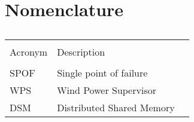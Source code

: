 \chapter{Nomenclature}


\begin{table}[ht]
\caption[Nomenclature]{\textsc{}} %
\centering %
\begin{tabular}{l l l} %
\hline\hline\\ %
 Acronym & Description \\ [0.5ex] %
\hline\\ %

	SPOF & Single point of failure \\
	WPS &  Wind Power Supervisor\\
	DSM &  Distributed Shared Memory\\[1ex] %

\hline %
\end{tabular}
\normalsize
\label{table:nomenclature} %
\end{table}

